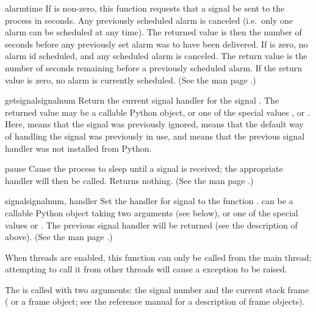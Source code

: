 \begin{funcdesc}{alarm}{time}
  If  is non-zero, this function requests that a
   signal be sent to the process in  seconds.
  Any previously scheduled alarm is canceled (i.e.\ only one alarm can
  be scheduled at any time).  The returned value is then the number of
  seconds before any previously set alarm was to have been delivered.
  If  is zero, no alarm id scheduled, and any scheduled
  alarm is canceled.  The return value is the number of seconds
  remaining before a previously scheduled alarm.  If the return value
  is zero, no alarm is currently scheduled.  (See the \UNIX{} man page
  .)
\end{funcdesc}

\begin{funcdesc}{getsignal}{signalnum}
  Return the current signal handler for the signal .
  The returned value may be a callable Python object, or one of the
  special values ,  or
  .  Here,  means that the
  signal was previously ignored,  means that the
  default way of handling the signal was previously in use, and
   means that the previous signal handler was not installed
  from Python.
\end{funcdesc}

\begin{funcdesc}{pause}{}
  Cause the process to sleep until a signal is received; the
  appropriate handler will then be called.  Returns nothing.  (See the
  \UNIX{} man page .)
\end{funcdesc}

\begin{funcdesc}{signal}{signalnum, handler}
  Set the handler for signal  to the function
  .   can be a callable Python object
  taking two arguments (see below), or
  one of the special values  or
  .  The previous signal handler will be returned
  (see the description of  above).  (See the
  \UNIX{} man page .)

  When threads are enabled, this function can only be called from the
  main thread; attempting to call it from other threads will cause a
   exception to be raised.

  The  is called with two arguments: the signal number
  and the current stack frame ( or a frame object; see the
  reference manual for a description of frame objects).
\end{funcdesc}
